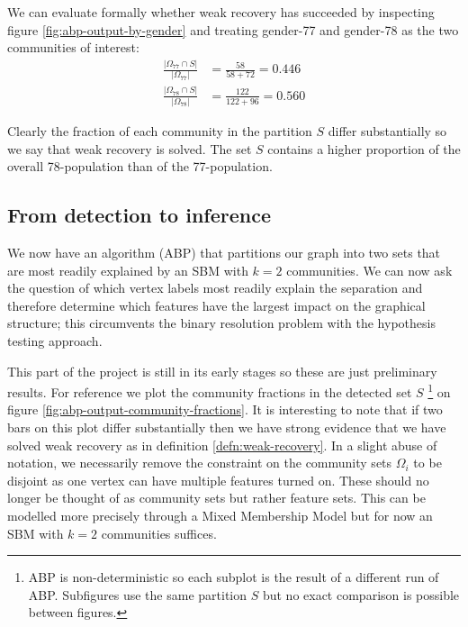 \documentclass[]{article}
\begin{document}
\begin{multicols*}{2}
We can evaluate formally whether weak recovery has succeeded by inspecting figure \ref{fig:abp-output-by-gender} and treating gender-77 and gender-78 as the two communities of interest:
%
\begin{equation}
	\begin{aligned}
	\frac{|\Omega_{77} \cap S|}{|\Omega_{77}|} &= \frac{58}{58+72} = 0.446 \\
	\frac{|\Omega_{78} \cap S|}{|\Omega_{78}|} &= \frac{122}{122+96} = 0.560
	\end{aligned}
\end{equation}

Clearly the fraction of each community in the partition $S$ differ substantially so we say that weak recovery is solved. The set $S$ contains a higher proportion of the overall 78-population than of the 77-population.

\subsection{From detection to inference}
\label{sect:detection-to-inference}

We now have an algorithm (ABP) that partitions our graph into two sets that are most readily explained by an SBM with $k=2$ communities. We can now ask the question of which vertex labels most readily explain the separation and therefore determine which features have the largest impact on the graphical structure; this circumvents the binary resolution problem with the hypothesis testing approach.

This part of the project is still in its early stages so these are just preliminary results. For reference we plot the community fractions in the detected set $S$
\footnote{ABP is non-deterministic so each subplot is the result of a different run of ABP. Subfigures use the same partition $S$ but no exact comparison is possible between figures.}
on figure \ref{fig:abp-output-community-fractions}. It is interesting to note that if two bars on this plot differ substantially then we have strong evidence that we have solved weak recovery as in definition \ref{defn:weak-recovery}. In a slight abuse of notation, we necessarily remove the constraint on the community sets $\Omega_i$ to be disjoint as one vertex can have multiple features turned on. These should no longer be thought of as community sets but rather feature sets. This can be modelled more precisely through a Mixed Membership Model but for now an SBM with $k=2$ communities suffices.


\end{multicols*}
\end{document}
